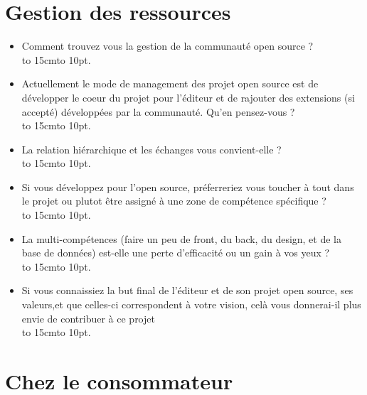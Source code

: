 \section*{Gestion des ressources}

\begin{itemize}[label=\textbullet, font=\LARGE \color{burntorange}]
	\item Comment trouvez vous la gestion de la communauté open source ?\\
	\hbox to 15cm{\leaders\hbox to 10pt{\hss . \hss}\hfil}
	\item Actuellement le mode de management des projet open source est de développer le coeur du projet pour l'éditeur et de rajouter des extensions (si accepté) développées par la communauté. Qu'en pensez-vous ?\\
	\hbox to 15cm{\leaders\hbox to 10pt{\hss . \hss}\hfil}
	\item La relation hiérarchique et les échanges vous convient-elle ?\\
	\hbox to 15cm{\leaders\hbox to 10pt{\hss . \hss}\hfil}
	\item Si vous développez pour l'open source, préferreriez vous toucher à tout dans le projet ou plutot être assigné à une zone de compétence spécifique ?\\
	\hbox to 15cm{\leaders\hbox to 10pt{\hss . \hss}\hfil}
	\item La multi-compétences (faire un peu de front, du back, du design, et de la base de données) est-elle une perte d'efficacité ou un gain à vos yeux ?\\
	\hbox to 15cm{\leaders\hbox to 10pt{\hss . \hss}\hfil}
	\item Si vous connaissiez la but final de l'éditeur et de son projet open source, ses valeurs,et que celles-ci correspondent à votre vision, celà vous donnerai-il plus envie de contribuer à ce projet\\
	\hbox to 15cm{\leaders\hbox to 10pt{\hss . \hss}\hfil}
\end{itemize}

\newpage
\section*{Chez le consommateur}

